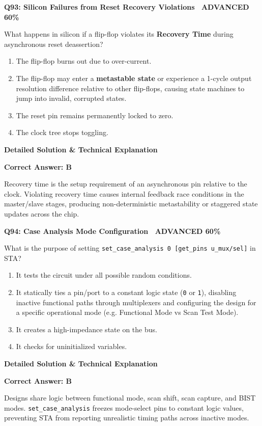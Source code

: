\documentclass[11pt,a4paper]{article}
\newcommand{\badgeadv}{{\color{white}\colorbox{advred}{\bfseries\sffamily\tiny\ ADVANCED 60\%\ }}}
\newenvironment{qbox}[2]{%
  \begin{mdframed}[style=qstyle]%
  {\bfseries\sffamily\color{primaryblue}#1 \hfill #2}\par\vspace{2pt}%
}{%
  \end{mdframed}%
}
\newenvironment{ansbox}{%
  \begin{mdframed}[style=ansstyle]%
  {\bfseries\sffamily\color{ansgreen}\small Detailed Solution \& Technical Explanation}\par\vspace{2pt}\small%
}{%
  \end{mdframed}%
}
\begin{document}
\begin{qbox}{Q93: Silicon Failures from Reset Recovery Violations}{\badgeadv}
What happens in silicon if a flip-flop violates its \textbf{Recovery Time} during asynchronous reset deassertion?
\begin{enumerate}[label=\textbf{\Alph*.}]
  \item The flip-flop burns out due to over-current.
  \item The flip-flop may enter a \textbf{metastable state} or experience a 1-cycle output resolution difference relative to other flip-flops, causing state machines to jump into invalid, corrupted states.
  \item The reset pin remains permanently locked to zero.
  \item The clock tree stops toggling.
\end{enumerate}
\end{qbox}
\begin{ansbox}
\textbf{Correct Answer: B}

Recovery time is the setup requirement of an asynchronous pin relative to the clock. Violating recovery time causes internal feedback race conditions in the master/slave stages, producing non-deterministic metastability or staggered state updates across the chip.
\end{ansbox}

\begin{qbox}{Q94: Case Analysis Mode Configuration}{\badgeadv}
What is the purpose of setting \texttt{set\_case\_analysis 0 [get\_pins u\_mux/sel]} in STA?
\begin{enumerate}[label=\textbf{\Alph*.}]
  \item It tests the circuit under all possible random conditions.
  \item It statically ties a pin/port to a constant logic state (\texttt{0} or \texttt{1}), disabling inactive functional paths through multiplexers and configuring the design for a specific operational mode (e.g. Functional Mode vs Scan Test Mode).
  \item It creates a high-impedance state on the bus.
  \item It checks for uninitialized variables.
\end{enumerate}
\end{qbox}
\begin{ansbox}
\textbf{Correct Answer: B}

Designs share logic between functional mode, scan shift, scan capture, and BIST modes. \texttt{set\_case\_analysis} freezes mode-select pins to constant logic values, preventing STA from reporting unrealistic timing paths across inactive modes.
\end{ansbox}
\end{document}
